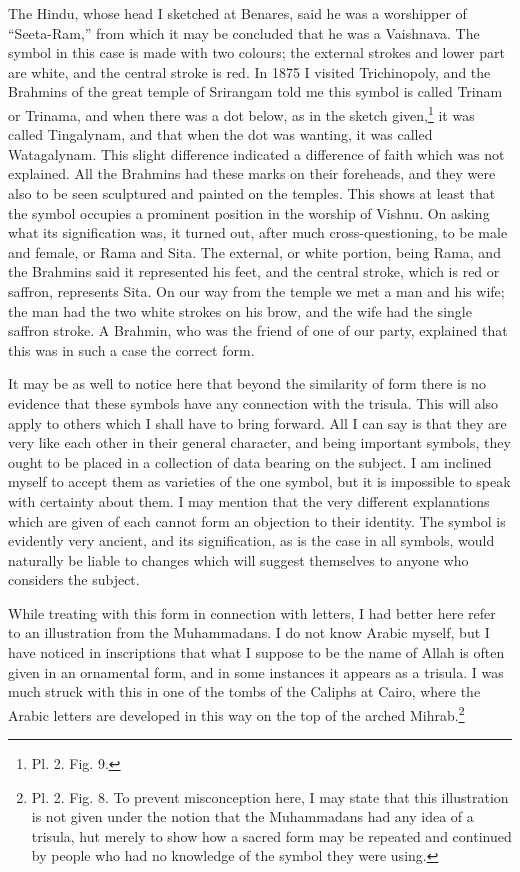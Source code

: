 \documentclass[a4paper, 11pt, oneside, english, landscape, twocolumn]{article}
\begin{document}
The Hindu, whose head I sketched at Benares, said he was a worshipper of ``Seeta-Ram,'' from which it may be concluded that he was a Vaishnava. The symbol in this case is made with two colours; the external strokes and lower part are white, and the central stroke is red. In 1875 I visited Trichinopoly, and the Brahmins of the great temple of Srirangam told me this symbol is called Trinam or Trinama, and when there was a dot below, as in the sketch given,\footnote{Pl. 2. Fig. 9.} it was called Tingalynam, and that when the dot was wanting, it was called Watagalynam. This slight difference indicated a difference of faith which was not explained. All the Brahmins had these marks on their foreheads, and they were also to be seen sculptured and painted on the temples. This shows at least that the symbol occupies a prominent position in the worship of Vishnu. On asking what its signification was, it turned out, after much cross-questioning, to be male and female, or Rama and Sita. The external, or white portion, being Rama, and the Brahmins said it represented his feet, and the central stroke, which is red or saffron, represents Sita. On our way from the temple we met a man and his wife; the man had the two white strokes on his brow, and the wife had the single saffron stroke. A Brahmin, who was the friend of one of our party, explained that this was in such a case the correct form.

It may be as well to notice here that beyond the similarity of form there is no evidence that these symbols have any connection with the trisula. This will also apply to others which I shall have to bring forward. All I can say is that they are very like each other in their general character, and being important symbols, they ought to be placed in a collection of data bearing on the subject. I am inclined myself to accept them as varieties of the one symbol, but it is impossible to speak with certainty about them. I may mention that the very different explanations which are given of each cannot form an objection to their identity. The symbol is evidently very ancient, and its signification, as is the case in all symbols, would naturally be liable to changes which will suggest themselves to anyone who considers the subject.

While treating with this form in connection with letters, I had better here refer to an illustration from the Muhammadans. I do not know Arabic myself, but I have noticed in inscriptions that what I suppose to be the name of Allah is often given in an ornamental form, and in some instances it appears as a trisula. I was much struck with this in one of the tombs of the Caliphs at Cairo, where the Arabic letters are developed in this way on the top of the arched Mihrab.\footnote{Pl. 2. Fig. 8. To prevent misconception here, I may state that this illustration is not given under the notion that the Muhammadans had any idea of a trisula, hut merely to show how a sacred form may be repeated and continued by people who had no knowledge of the symbol they were using.}
\end{document}
